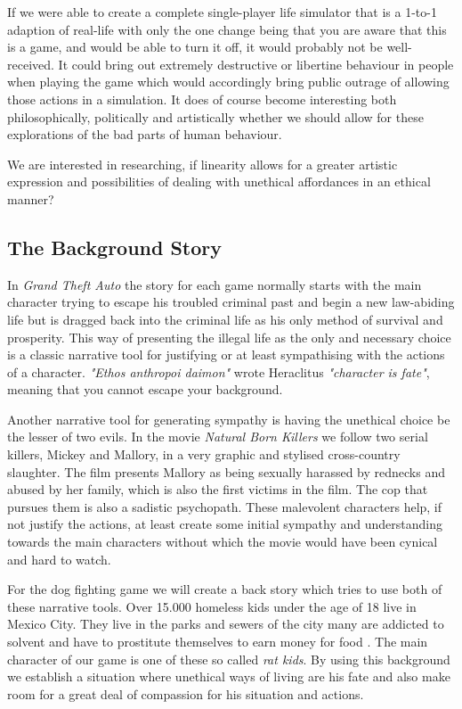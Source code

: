 If we were able to create a complete single-player life simulator that is a 1-to-1 adaption of real-life with only the one change being that you are aware that this is a game, and would be able to turn it off, it would probably not be well-received. It could bring out extremely destructive or libertine behaviour in people when playing the game which would accordingly bring public outrage of allowing those actions in a simulation. It does of course become interesting both philosophically, politically and artistically whether we should allow for these explorations of the bad parts of human behaviour.\

We are interested in researching, if linearity allows for a greater artistic expression and possibilities of dealing with unethical affordances in an ethical manner? \

\subsection{The Background Story}
\label{story}
In \textit{Grand Theft Auto} the story for each game normally starts with the main character trying to escape his troubled criminal past and begin a new law-abiding life but is dragged back into the criminal life as his only method of survival and prosperity. This way of presenting the illegal life as the only and necessary choice is a classic narrative tool for justifying or at least sympathising with the actions of a character. \textit{"Ethos anthropoi daimon"} wrote Heraclitus \- \textit{"character is fate"}, meaning that you cannot escape your background.\ 

Another narrative tool for generating sympathy is having the unethical choice be the lesser of two evils. In the movie \textit{Natural Born Killers} \citep{stone1994natural} we follow two serial killers, Mickey and Mallory, in a very graphic and stylised cross-country slaughter. The film presents Mallory as being sexually harassed by rednecks and abused by her family, which is also the first victims in the film. The cop that pursues them is also a sadistic psychopath. These malevolent characters help, if not justify the actions, at least create some initial sympathy and understanding towards the main characters without which the movie would have been cynical and hard to watch. \

For the dog fighting game we will create a back story which tries to use both of these narrative tools. Over 15.000 homeless kids under the age of 18 live in Mexico City. They live in the parks and sewers of the city many are addicted to solvent and have to prostitute themselves to earn money for food \citep{baverstock}. The main character of our game is one of these so called \textit{rat kids}. By using this background we establish a situation where unethical ways of living are his fate and also make room for a great deal of compassion for his situation and actions. \

